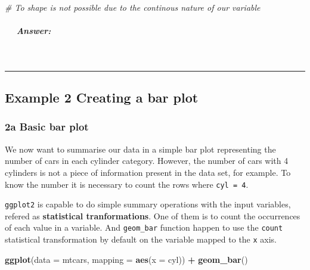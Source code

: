\documentclass[
]{article}
\newenvironment{Shaded}{\begin{snugshade}}{\end{snugshade}}
\newcommand{\AttributeTok}[1]{\textcolor[rgb]{0.13,0.29,0.53}{#1}}
\newcommand{\CommentTok}[1]{\textcolor[rgb]{0.56,0.35,0.01}{\textit{#1}}}
\newcommand{\FunctionTok}[1]{\textcolor[rgb]{0.13,0.29,0.53}{\textbf{#1}}}
\newcommand{\NormalTok}[1]{#1}
\newcommand{\SpecialCharTok}[1]{\textcolor[rgb]{0.81,0.36,0.00}{\textbf{#1}}}
\begin{document}
\begin{Shaded}
\begin{Highlighting}[]
\CommentTok{\# To shape is not possible due to the continous nature of our variable}
\end{Highlighting}
\end{Shaded}

\subparagraph{  Answer:}\label{answer-1}

 

\begin{center}\rule{0.5\linewidth}{0.5pt}\end{center}

\subsection{\texorpdfstring{ \textbf{Example 2} \textbar{} Creating a
bar
plot}{ Example 2 \textbar{} Creating a bar plot}}\label{example-2-creating-a-bar-plot}

\subsubsection{\texorpdfstring{\textbf{2a} \textbar{} Basic bar
plot}{2a \textbar{} Basic bar plot}}\label{a-basic-bar-plot}

We now want to summarise our data in a simple bar plot representing the
number of cars in each cylinder category. However, the number of cars
with 4 cylinders is not a piece of information present in the data set,
for example. To know the number it is necessary to count the rows where
\texttt{cyl\ =\ 4}.

\texttt{ggplot2} is capable to do simple summary operations with the
input variables, refered as \textbf{\textbf{statistical
tranformations}}. One of them is to count the occurrences of each value
in a variable. And \texttt{geom\_bar} function happen to use the
\texttt{count} statistical transformation by default on the variable
mapped to the \texttt{x} axis.

\begin{Shaded}
\begin{Highlighting}[]
\FunctionTok{ggplot}\NormalTok{(}\AttributeTok{data =}\NormalTok{ mtcars, }\AttributeTok{mapping =} \FunctionTok{aes}\NormalTok{(}\AttributeTok{x =}\NormalTok{ cyl)) }\SpecialCharTok{+}
  \FunctionTok{geom\_bar}\NormalTok{()}
\end{Highlighting}
\end{Shaded}
\end{document}

